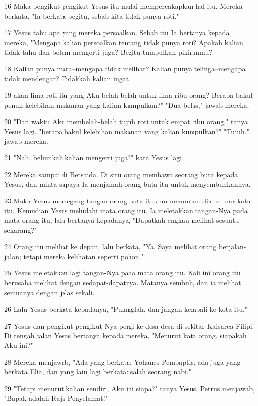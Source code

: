 \par 16 Maka pengikut-pengikut Yesus itu mulai mempercakapkan hal itu. Mereka berkata, "Ia berkata begitu, sebab kita tidak punya roti."
\par 17 Yesus tahu apa yang mereka persoalkan. Sebab itu Ia bertanya kepada mereka, "Mengapa kalian persoalkan tentang tidak punya roti? Apakah kalian tidak tahu dan belum mengerti juga? Begitu tumpulkah pikiranmu?
\par 18 Kalian punya mata--mengapa tidak melihat? Kalian punya telinga--mengapa tidak mendengar? Tidakkah kalian ingat
\par 19 akan lima roti itu yang Aku belah-belah untuk lima ribu orang? Berapa bakul penuh kelebihan makanan yang kalian kumpulkan?" "Dua belas," jawab mereka.
\par 20 "Dan waktu Aku membelah-belah tujuh roti untuk empat ribu orang," tanya Yesus lagi, "berapa bakul kelebihan makanan yang kalian kumpulkan?" "Tujuh," jawab mereka.
\par 21 "Nah, belumkah kalian mengerti juga?" kata Yesus lagi.
\par 22 Mereka sampai di Betsaida. Di situ orang membawa seorang buta kepada Yesus, dan minta supaya Ia menjamah orang buta itu untuk menyembuhkannya.
\par 23 Maka Yesus memegang tangan orang buta itu dan menuntun dia ke luar kota itu. Kemudian Yesus meludahi mata orang itu. Ia meletakkan tangan-Nya pada mata orang itu, lalu bertanya kepadanya, "Dapatkah engkau melihat sesuatu sekarang?"
\par 24 Orang itu melihat ke depan, lalu berkata, "Ya. Saya melihat orang berjalan-jalan; tetapi mereka kelihatan seperti pohon."
\par 25 Yesus meletakkan lagi tangan-Nya pada mata orang itu. Kali ini orang itu berusaha melihat dengan sedapat-dapatnya. Matanya sembuh, dan ia melihat semuanya dengan jelas sekali.
\par 26 Lalu Yesus berkata kepadanya, "Pulanglah, dan jangan kembali ke kota itu."
\par 27 Yesus dan pengikut-pengikut-Nya pergi ke desa-desa di sekitar Kaisarea Filipi. Di tengah jalan Yesus bertanya kepada mereka, "Menurut kata orang, siapakah Aku ini?"
\par 28 Mereka menjawab, "Ada yang berkata: Yohanes Pembaptis; ada juga yang berkata Elia, dan yang lain lagi berkata: salah seorang nabi."
\par 29 "Tetapi menurut kalian sendiri, Aku ini siapa?" tanya Yesus. Petrus menjawab, "Bapak adalah Raja Penyelamat!"
